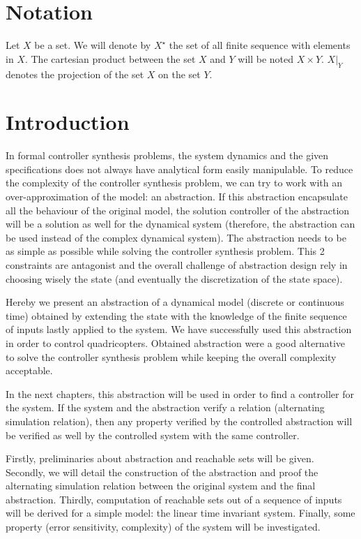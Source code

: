 \newcommand{\Cont}{\mathcal{C}}%
\section{Notation}
Let $X$ be a set. We will denote by $X^\star$ the set of all finite sequence with elements in $X$.
The cartesian product between the set $X$ and $Y$ will be noted $X \times Y$. $X|_Y$ denotes the projection of the set $X$ on the set $Y$.

\section{Introduction}
In formal controller synthesis problems, the system dynamics and the given specifications does not always have analytical form easily manipulable.
To reduce the complexity of the controller synthesis problem, we can try to work with an over-approximation of the model: an abstraction. If this abstraction encapsulate all the behaviour of the original model, the solution controller of the abstraction will be a solution as well for the dynamical system (therefore, the abstraction can be used instead of the complex dynamical system).
The abstraction needs to be as simple as possible while solving the controller synthesis problem.
This 2 constraints are antagonist and the overall challenge of abstraction design rely in choosing wisely the state (and eventually the discretization of the state space).

Hereby we present an abstraction of a dynamical model (discrete or continuous time) obtained by extending the state with the knowledge of the finite sequence of inputs lastly applied to the system.
We have successfully used this abstraction in order to control quadricopters. Obtained abstraction were a good alternative to solve the controller synthesis problem while keeping the overall complexity acceptable.

In the next chapters, this abstraction will be used in order to find a controller for the system.
If the system and the abstraction verify a relation (alternating simulation relation), then any property verified by the controlled abstraction will be verified as well by the controlled system with the same controller.

Firstly, preliminaries about abstraction and reachable sets will be given. Secondly, we will detail the construction of the abstraction and proof the alternating simulation relation between the original system and the final abstraction. Thirdly, computation of reachable sets out of a sequence of inputs will be derived for a simple model: the linear time invariant system. Finally, some property (error sensitivity, complexity) of the system will be investigated.


